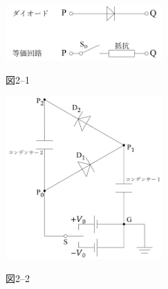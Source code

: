 \begin{minipage}{0.5\linewidth}
  \centering
  \begin{figure}[H]
    \centering
    \includegraphics[width=6cm]{fig/fig_4_19_1.pdf}

    {図2--1}
  \end{figure}
  \begin{figure}[H]
    \centering
    \includegraphics[width=6cm]{fig/fig_4_19_2.pdf}

    {図2--2}
  \end{figure}
\end{minipage}
